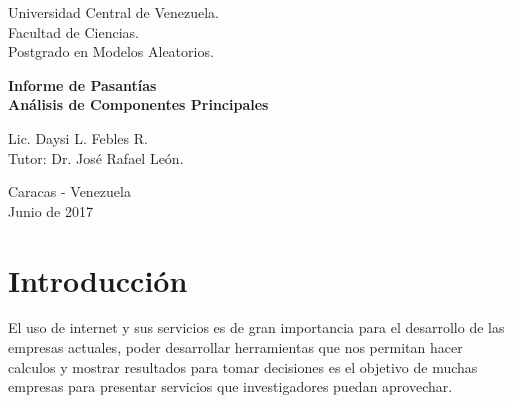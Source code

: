 \documentclass[12pt,letterpaper]{report} %
\begin{document}
\thispagestyle{empty}
\thispagestyle{empty}

\enlargethispage{3cm}

\pagestyle{empty}


\begin{center}
\large
Universidad Central de Venezuela. \\
Facultad de Ciencias.\\
Postgrado en Modelos Aleatorios.\\
\end{center}
\vspace{1cm}

\vspace{0.8cm}

\begin{center}
\large{\bf Informe de Pasantías\\ Análisis de Componentes Principales}
\end{center}

\vspace{3cm}

\begin{center}
\small
\parbox{11.5 cm}{
\begin{center}
Lic. Daysi L. Febles R.\\
Tutor: Dr. Jos\'e Rafael Le\'on. \end{center} }
\end{center}

\vspace{2cm}

\begin{center}
Caracas - Venezuela\\ Junio de 2017
\end{center}

\newpage

\chapter{Introducción}

El uso de internet y sus servicios es de gran importancia para el desarrollo de las empresas actuales, poder desarrollar herramientas que nos permitan hacer calculos y mostrar resultados para tomar decisiones es el objetivo de muchas empresas para presentar servicios que investigadores puedan aprovechar.
\end{document}
